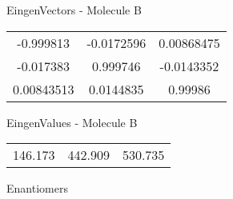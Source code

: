 \begin{multicols}{2}
\begin{center}
\vtab
 EingenVectors - Molecule B     \\
\vtab
\begin{tabular}{|c c c|}
-0.999813	 & 	-0.0172596	 & 	0.00868475	 \\
-0.017383	 & 	0.999746	 & 	-0.0143352	 \\
0.00843513	 & 	0.0144835	 & 	0.99986
\end{tabular}

\vtab
 EingenValues - Molecule B     \\
\vtab
\begin{tabular}{|c c c|}
146.173	 & 	442.909	 & 	530.735	 \\
\end{tabular}

\end{center}
\end{multicols}
\begin{center}
\vtab
\vtab
\textcolor{NavyBlue}{\Large Enantiomers}
\end{center}

 \newpage
